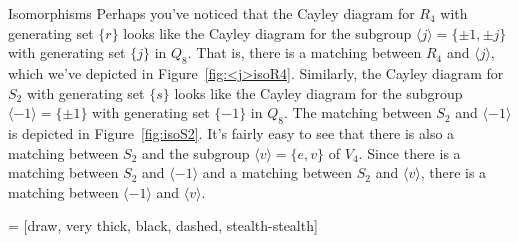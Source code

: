 \begin{section}{Isomorphisms}
Perhaps you've noticed that the Cayley diagram for $R_4$ with generating set $\{r\}$ looks like the Cayley diagram for the subgroup $\langle j\rangle=\{\pm 1,\pm j\}$ with generating set $\{j\}$ in $Q_8$.  That is, there is a matching between $R_4$ and $\langle j\rangle$, which we've depicted in Figure~\ref{fig:<j>isoR4}. Similarly, the Cayley diagram for $S_2$ with generating set $\{s\}$ looks like the Cayley diagram for the subgroup $\langle -1\rangle=\{\pm 1\}$ with generating set $\{-1\}$ in $Q_8$.  The matching between $S_2$ and $\langle -1\rangle$ is depicted in Figure~\ref{fig:isoS2}.  It's fairly easy to see that there is also a matching between $S_2$ and the subgroup $\langle v\rangle =\{e,v\}$ of $V_4$.  Since there is a matching between $S_2$ and $\langle -1\rangle$ and a matching between $S_2$ and $\langle v\rangle$, there is a matching between $\langle -1\rangle$ and $\langle v\rangle$.

 = [draw, very thick, black, dashed, stealth-stealth]

\begin{figure}[!ht]
\centering
{}
\end{figure}
\end{section}
